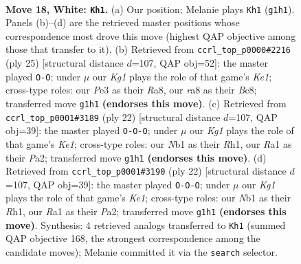\documentclass[11pt]{article}
\begin{document}
\clearpage

\begin{figure}[p]\centering
\begin{subfigure}{0.46\textwidth}\centering
\resizebox{\linewidth}{!}{%
\newchessgame
\chessboard[
  setfen={r1b2r1k/1p1n1p2/4pnp1/2b4p/p1N2B2/P3P1P1/1P3PBP/RN1R2K1 w - - 5 18},
  showmover=false,
  pgfstyle=straightmove, color=movearrow, markmove={g1-h1}
]}
\caption{}
\end{subfigure}\hfill
\begin{subfigure}{0.46\textwidth}\centering
\resizebox{\linewidth}{!}{%
\newchessgame
\chessboard[
  setfen={r1b1k2r/3n1pp1/pp2p2p/2bn4/P1N5/2P2N2/1P1BBPPP/R3K2R b KQkq - 1 13},
  showmover=false,
  pgfstyle=straightmove, color=movearrow, markmove={e8-g8}
]}
\caption{}
\end{subfigure}
\\[4pt]
\begin{subfigure}{0.46\textwidth}\centering
\resizebox{\linewidth}{!}{%
\newchessgame
\chessboard[
  setfen={rn5r/p3kppp/bp3n2/2pp4/3P4/1PN2NP1/P3PP1P/R3KB1R w KQ - 0 12},
  showmover=false,
  pgfstyle=straightmove, color=movearrow, markmove={e1-c1}
]}
\caption{}
\end{subfigure}\hfill
\begin{subfigure}{0.46\textwidth}\centering
\resizebox{\linewidth}{!}{%
\newchessgame
\chessboard[
  setfen={rn5r/p3kppp/bp3n2/2pp4/3P4/1PN2NP1/P3PP1P/R3KB1R w KQ - 0 12},
  showmover=false,
  pgfstyle=straightmove, color=movearrow, markmove={e1-c1}
]}
\caption{}
\end{subfigure}
\caption{\textbf{Move 18, White: \texttt{Kh1}.} (a) Our position; Melanie plays \texttt{Kh1} (\texttt{g1h1}). Panels (b)--(d) are the retrieved master positions whose correspondence most drove this move (highest QAP objective among those that transfer to it). (b) Retrieved from \texttt{ccrl\_top\_p0000\#2216} (ply 25) [structural distance $d$=107, QAP obj=52]: the master played \texttt{O-O}; under $\mu$ our \emph{Kg1} plays the role of that game's \emph{Ke1}; cross-type roles: our \emph{P}e3 as their \emph{R}a8, our \emph{r}a8 as their \emph{B}c8; transferred move \texttt{g1h1} \textbf{(endorses this move)}. (c) Retrieved from \texttt{ccrl\_top\_p0001\#3189} (ply 22) [structural distance $d$=107, QAP obj=39]: the master played \texttt{O-O-O}; under $\mu$ our \emph{Kg1} plays the role of that game's \emph{Ke1}; cross-type roles: our \emph{N}b1 as their \emph{R}h1, our \emph{R}a1 as their \emph{P}a2; transferred move \texttt{g1h1} \textbf{(endorses this move)}. (d) Retrieved from \texttt{ccrl\_top\_p0001\#3190} (ply 22) [structural distance $d$=107, QAP obj=39]: the master played \texttt{O-O-O}; under $\mu$ our \emph{Kg1} plays the role of that game's \emph{Ke1}; cross-type roles: our \emph{N}b1 as their \emph{R}h1, our \emph{R}a1 as their \emph{P}a2; transferred move \texttt{g1h1} \textbf{(endorses this move)}. Synthesis: 4 retrieved analogs transferred to \texttt{Kh1} (summed QAP objective 168, the strongest correspondence among the candidate moves); Melanie committed it via the \texttt{search} selector.}
\label{fig:thought-m34}
\end{figure}
\end{document}
